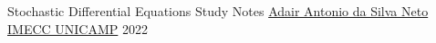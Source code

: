 \documentclass[tikz]{report}
\begin{document}
\tituloum
{Stochastic Differential Equations}
{Study Notes}
{\href{https://github.com/adairneto}{Adair Antonio da Silva Neto}}
{\href{https://www.ime.unicamp.br/}{IMECC \textendash UNICAMP}}
{2022}

%

\thispagestyle{empty}
\tableofcontents

\newpage





\appendix


\nocite{*}


\end{document}
